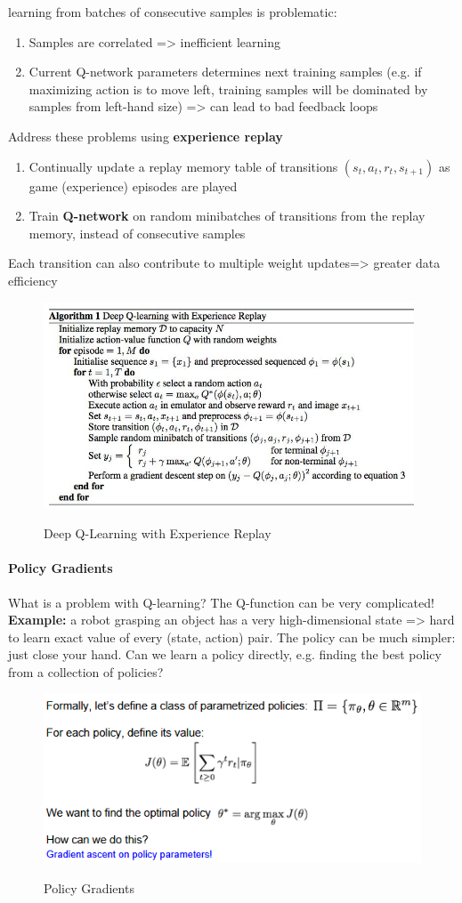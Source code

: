 \documentclass[11pt]{article}
\begin{document}
 learning from batches of consecutive samples is problematic:
\begin{enumerate}
    \item Samples are correlated => inefficient learning
    \item Current Q-network parameters determines next training samples (e.g. if maximizing action is to move left, training samples will be dominated by samples from left-hand size) => can lead to bad feedback loops
\end{enumerate}{}
Address these problems using \textbf{experience replay}
\begin{enumerate}
    \item Continually update a replay memory table of transitions $(s_t, a_t, r_t, s_{t+1})$ as game (experience) episodes are played
    \item Train \textbf{Q-network} on random minibatches of transitions from the replay memory, instead of consecutive samples
\end{enumerate}{}
Each transition can also contribute to multiple weight updates=> greater data efficiency
\begin{figure}[h]
\centering
\captionsetup{justification=centering}
\includegraphics[width=0.7\linewidth]{L1317.pdf}
\label{fig:1317}
\caption{Deep Q-Learning with Experience Replay }
\end{figure}
\paragraph{Policy Gradients}
What is a problem with Q-learning? The Q-function can be very complicated!
\textbf{Example:} a robot grasping an object has a very high-dimensional state => hard to learn exact value of every (state, action) pair. The policy can be much simpler: just close your hand. Can we learn a policy directly, e.g. finding the best policy from a collection of policies?
\clearpage
\begin{figure}[h]
\centering
\captionsetup{justification=centering}
\includegraphics[width=0.7\linewidth]{L1318.pdf}
\label{fig:1318}
\caption{Policy Gradients }
\end{figure}
\end{document}
